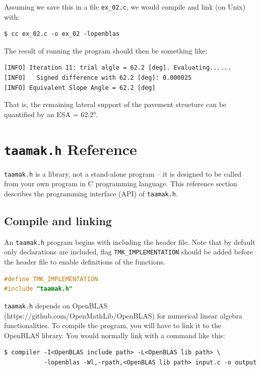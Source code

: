 \documentclass{article}
\newcommand{\tmk}{\texttt{taamak.h}}
\begin{document}
Assuming we save this in a file \texttt{ex\_02.c}, we would compile and link (on Unix) with:
\begin{commandline}
\begin{verbatim}
$ cc ex_02.c -o ex_02 -lopenblas
\end{verbatim}
\end{commandline}

The result of running the program should then be something like:
\begin{commandline}
\begin{verbatim}
[INFO] Iteration 11: trial algle = 62.2 [deg]. Evaluating......
[INFO]   Signed difference with 62.2 [deg]: 0.000025
[INFO] Equivalent Slope Angle = 62.2 [deg]
\end{verbatim}
\end{commandline}

That is, the remaining lateral support of the pavement structure can be quantified by an ESA = \ang{62.2}.

\clearpage

\section{\tmk{} Reference} 
\tmk{} is a library, not a stand-alone program -- it is designed to be called from your own program in C programming language. This reference section describes the programming interface (API) of \tmk{}. 

\subsection{Compile and linking}
An \tmk{} program begins with including the header file. Note that by default only declarations are included, flag \texttt{TMK\_IMPLEMENTATION} should be added before the header file to enable definitions of the functions.  
\begin{file}[demo.c]
\begin{lstlisting}[language=C]
#define TMK_IMPLEMENTATION
#include "taamak.h"
\end{lstlisting}
\end{file}

\texttt{taamak.h} depends on OpenBLAS (https://github.com/OpenMathLib/OpenBLAS) for numerical linear algebra functionalities. To compile the program, you will have to link it to the OpenBLAS library. You would normally link with a command like this: 
\begin{commandline}
\begin{verbatim}
$ compiler -I<OpenBLAS include path> -L<OpenBLAS lib path> \
           -lopenblas -Wl,-rpath,<OpenBLAS lib path> input.c -o output
\end{verbatim}
\end{commandline}
\end{document}
